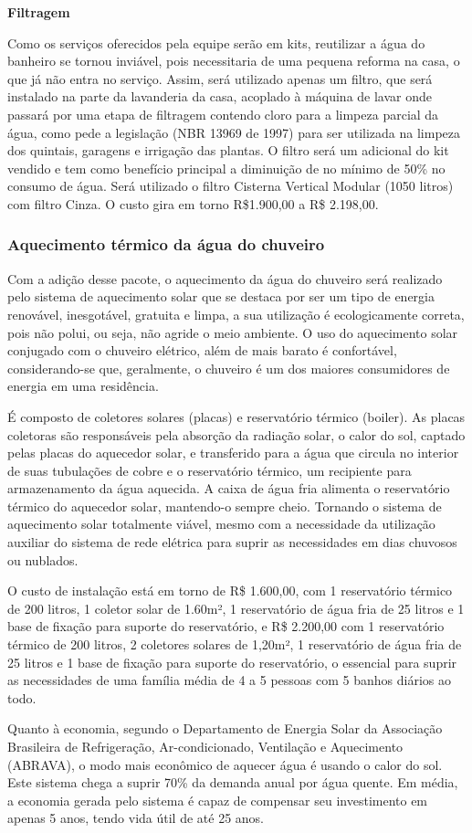 \textbf{Filtragem}
\par Como os serviços oferecidos pela equipe serão em kits, reutilizar a água do banheiro se tornou inviável, pois necessitaria de uma pequena reforma na casa, o que já não entra no serviço. Assim, será utilizado apenas um filtro, que será instalado na parte da lavanderia da casa, acoplado à máquina de lavar onde passará por uma etapa de filtragem contendo cloro para a limpeza parcial da água, como pede a legislação (NBR 13969 de 1997) para ser utilizada na limpeza dos quintais, garagens e irrigação das plantas. O filtro será um adicional do kit vendido e tem como benefício principal a diminuição de no mínimo de 50\% no consumo de água. Será utilizado o filtro Cisterna Vertical Modular (1050 litros) com filtro Cinza.  O custo gira em torno R\$1.900,00 a R\$ 2.198,00.

\subsubsection{Aquecimento térmico da água do chuveiro}
\par Com a adição desse pacote, o aquecimento da água do chuveiro será realizado pelo sistema de aquecimento solar que se destaca por ser um tipo de energia renovável, inesgotável, gratuita e limpa, a sua utilização é ecologicamente correta, pois não polui, ou seja, não agride o meio ambiente. O uso do aquecimento solar conjugado com o chuveiro elétrico, além de mais barato é confortável, considerando-se que, geralmente, o chuveiro é um dos maiores consumidores de energia em uma residência.
\par É composto de coletores solares (placas) e reservatório térmico (boiler). As placas coletoras são responsáveis pela absorção da radiação solar, o calor do sol, captado pelas placas do aquecedor solar, e transferido para a água que circula no interior de suas tubulações de cobre e o reservatório térmico, um recipiente para armazenamento da água aquecida. A caixa de água fria alimenta o reservatório térmico do aquecedor solar, mantendo-o sempre cheio. Tornando o sistema de aquecimento solar totalmente viável, mesmo com a necessidade da utilização auxiliar do sistema de rede elétrica para suprir as necessidades em dias chuvosos ou nublados.
\par O custo de instalação está em torno de R\$ 1.600,00, com 1 reservatório térmico de 200 litros, 1 coletor solar de 1.60m², 1 reservatório de água fria de 25 litros e 1 base de fixação para suporte do reservatório, e R\$ 2.200,00 com 1 reservatório térmico de 200 litros, 2 coletores solares de 1,20m², 1 reservatório de água fria de 25 litros e 1 base de fixação para suporte do reservatório, o essencial para suprir as necessidades de uma família média de 4 a 5 pessoas com 5 banhos diários ao todo.
\par Quanto à economia, segundo o Departamento de Energia Solar da Associação Brasileira de Refrigeração, Ar-condicionado, Ventilação e Aquecimento (ABRAVA), o modo mais econômico de aquecer água é usando o calor do sol. Este sistema chega a suprir 70\% da demanda anual por água quente. Em média, a economia gerada pelo sistema é capaz de compensar seu investimento em apenas 5 anos, tendo vida útil de até 25 anos.

